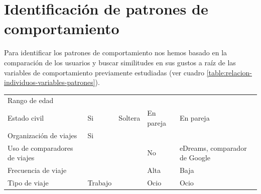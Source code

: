 \section{Identificación de patrones de comportamiento}
Para identificar los patrones de comportamiento nos hemos basado en la comparación de los usuarios y buscar similitudes en sus gustos a raíz de las variables de comportamiento previamente estudiadas (ver cuadro \ref{table:relacion-individuos-variables-patrones}).
\begin{table}[H]
    \centering
    \begin{tabular}{|p{10em}|p{7em}|p{7em}|p{7em}|p{8em}|}
        \cline{2-5}
        \cellcolor{black}                 & \cellcolor{black}{\textcolor{white}{Madi}}  & \cellcolor{black}{\textcolor{white}{Sofía}}   & \cellcolor{black}{\textcolor{white}{Alberto}} & \cellcolor{black}{\textcolor{white}{Beatriz}} \\ \hline
        Rango de edad                     &                                             & \cellcolor{green}{18 - 25}                                       & \cellcolor{green}{18 - 25}                                       & \cellcolor{green}{18 - 25}                                       \\ \hline
        Estado civil                      & Si                                          & Soltera                                       & En pareja                                     & En pareja                                     \\ \hline
        Organización de viajes            & Si                                          & \cellcolor{green}{Si}                                            & \cellcolor{green}{Si}                                            & \cellcolor{green}{Si}                                            \\ \hline
        Uso de comparadores de viajes     & \cellcolor{yellow}{No}                      & \cellcolor{purple}{Kayak, Skyscanner, Trivago}                    & No                                            & eDreams, comparador de Google                 \\ \hline
        Frecuencia de viaje               & \cellcolor{yellow}{Alta}                    & \cellcolor{purple}{Media}                                        & Alta                                          & Baja                                          \\ \hline
        Tipo de viaje                     & Trabajo                                     & \cellcolor{green}{Ocio}                                          & Ocio                                          & Ocio                                          \\ \hline

\end{tabular}
\end{table}
